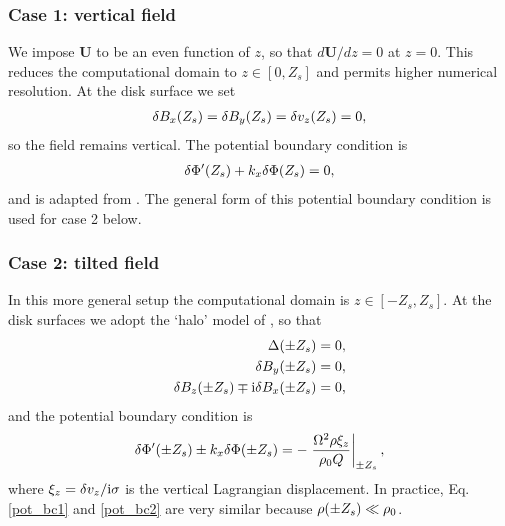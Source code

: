 \subsubsection{Case 1: vertical field}%
We impose $\bm{U}$ to be an even function of $z$, so that
$d\bm{U}/dz=0$ at $z=0$. This reduces the computational domain to
$z\in[0,Z_s]$ and permits higher numerical resolution. At the disk
surface we set %
\begin{align}
  \delta B_x(Z_s) = \delta B_y(Z_s) = \delta v_z (Z_s) = 0, 
\end{align}
so the field remains vertical. The potential boundary
condition is 
\begin{align}
  \delta \Phi^\prime(Z_s) + k_x\delta \Phi(Z_s) = 0 \label{pot_bc1},
\end{align}
and is adapted from \cite{goldreich65a}. The general form of this
potential boundary condition is used for case 2 below. 

\subsubsection{Case 2: tilted field} 
In this more general setup the computational domain is
$z\in[-Z_s, Z_s]$. At the disk surfaces we adopt the `halo' model of
\cite{gammie94}, so that
\begin{align}
  \Delta(\pm Z_s) & = 0, \\
  \delta B_y(\pm Z_s) & = 0,\\
  \delta B_z(\pm Z_s) \mp \mathrm{i} \delta B_x(\pm Z_s) &= 0,
\end{align}
and the potential boundary condition is 
\begin{align}
  \delta \Phi^\prime(\pm Z_s) \pm k_x\delta \Phi(\pm Z_s) =  - \left. \frac{\Omega^2
    \rho \xi_z}{\rho_0Q}\right|_{\pm Z_s}, \label{pot_bc2}
\end{align}
where $\xi_z=\delta v_z/\mathrm{i}\sigma$ is the vertical Lagrangian
displacement. In practice,  Eq. \ref{pot_bc1} and \ref{pot_bc2} are
very similar because $\rho(\pm Z_s)\ll\rho_0$. 


